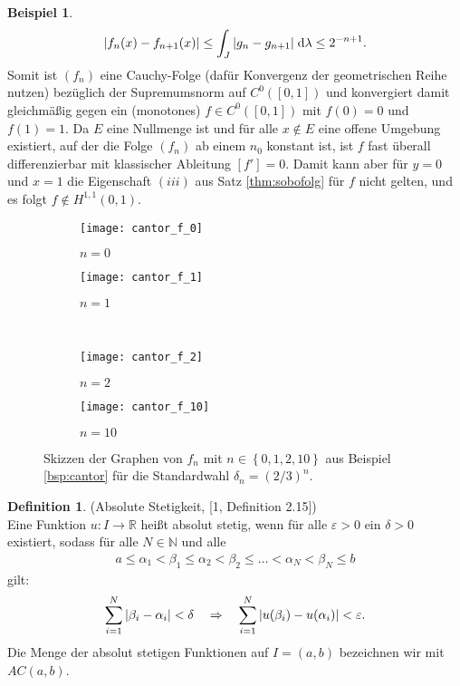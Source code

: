 \documentclass[twoside]{article}
\theoremstyle{definition}
\newtheorem{definition}[theorem]{Definition}
\newtheorem{example}[theorem]{Beispiel}
\newcommand{\R}{\mathbb{R}}
\newcommand{\N}{\mathbb{N}}
\newcommand{\lgk}{\left\{}
\newcommand{\rgk}{\right\}}
\newcommand{\lek}{\left[}
\newcommand{\rek}{\right]}
\begin{document}
\begin{example}
\begin{align*}
\abs{f_n(x) - f_{n+1}(x)} \leq \int_J \abs{g_n - g_{n+1}} \; \dd \lambda \leq 2^{-n+1}.
\end{align*}
Somit ist $(f_n)$ eine Cauchy-Folge (dafür Konvergenz der geometrischen Reihe nutzen) bezüglich der Supremumsnorm auf $C^0([0,1])$ und konvergiert damit gleichmäßig gegen ein (monotones) $f \in C^0([0,1])$ mit $f(0) = 0$ und $f(1) = 1$. Da $E$ eine Nullmenge ist und für alle $x \not \in E$ eine offene Umgebung existiert, auf der die Folge $(f_n)$ ab einem $n_0$ konstant ist, ist $f$ fast überall differenzierbar mit klassischer Ableitung $\lek f' \rek = 0$. Damit kann aber für $y = 0$ und $x = 1$ die Eigenschaft $(iii)$ aus Satz \ref{thm:sobofolg} für $f$ nicht gelten, und es folgt $f \not \in H^{1,1}(0,1)$.
\end{example}
\begin{figure}
\centering
	\begin{subfigure}[t]{0.49 \textwidth}
	\vskip 0pt
		\centering
		\texttt{[image: cantor\_f\_0]}
		\caption{$n = 0$}
		\label{fig:cantor_f_0}		
	\end{subfigure}
	\begin{subfigure}[t]{0.49 \textwidth}
	\vskip 0pt
		\centering
		\texttt{[image: cantor\_f\_1]}
		\caption{$n = 1$}
		\label{fig:cantor_f_1}
	\end{subfigure}\\
		\begin{subfigure}[t]{0.49 \textwidth}
	\vskip 0pt
		\centering
		\texttt{[image: cantor\_f\_2]}
		\caption{$n = 2$}
		\label{fig:cantor_f_2}		
	\end{subfigure}
	\begin{subfigure}[t]{0.49 \textwidth}
	\vskip 0pt
		\centering
		\texttt{[image: cantor\_f\_10]}
		\caption{$n = 10$}	
	\label{fig:cantor_f_10}
	\end{subfigure}
\caption{Skizzen der Graphen von $f_n$ mit $n \in \lgk 0,1,2,10 \rgk$ aus Beispiel \ref{bsp:cantor} für die Standardwahl $\delta_n = (2 / 3)^n$.}
\label{fig:cantor_f}
\end{figure}
\newpage
\begin{definition} (Absolute Stetigkeit, [1, Definition 2.15]) \\
Eine Funktion $u : I \to \R$ heißt absolut stetig, wenn für alle $\varepsilon > 0$ ein $\delta > 0$ existiert, sodass für alle $N \in \N$ und alle
\begin{align*}
a \leq \alpha_1 < \beta_1 \leq \alpha_2 < \beta_2 \leq \dots < \alpha_N < \beta_N \leq b
\end{align*}
gilt:
\begin{align}
\sum_{i=1}^N \abs{\beta_i - \alpha_i}< \delta \quad \Rightarrow \quad \sum_{i=1}^N \abs{u(\beta_i) - u(\alpha_i)} < \varepsilon. \label{eq:absstet}
\end{align}
Die Menge der absolut stetigen Funktionen auf $I=(a,b)$ bezeichnen wir mit $AC(a,b)$.
\end{definition}
\end{document}
